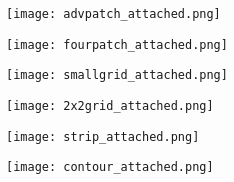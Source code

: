 \documentclass[times,twocolumn,final,authoryear]{elsarticle}
\begin{document}
\begin{figure}[]
\centering

\hspace{0in}
\begin{minipage}[]{.312\linewidth}
{               %
\begin{center}
    \texttt{[image: advpatch\_attached.png]}
\end{center}}
\vspace{-2ex}
\end{minipage}
\hspace{0in}
\begin{minipage}[]{.312\linewidth}
{               %
\begin{center}
    \texttt{[image: fourpatch\_attached.png]}
\end{center}}
\vspace{-2ex}
\end{minipage}
\hspace{0in}
\begin{minipage}[]{.312\linewidth}
{               %
\begin{center}
    \texttt{[image: smallgrid\_attached.png]}
\end{center}}
\vspace{-2ex}
\end{minipage}
\begin{minipage}[]{.312\linewidth}
{               %
\begin{center}
    \texttt{[image: 2x2grid\_attached.png]}
\end{center}}
\vspace{-2ex}
\end{minipage}
\hspace{0in}
\begin{minipage}[]{.312\linewidth}
{               %
\begin{center}
  \texttt{[image: strip\_attached.png]} 
\end{center}}
\vspace{-2ex}
\end{minipage}
\hspace{0in}
\begin{minipage}[]{.312\linewidth}
{               %
\begin{center}
    \texttt{[image: contour\_attached.png]}

\end{center}}
\end{minipage}
\end{figure}
\end{document}
